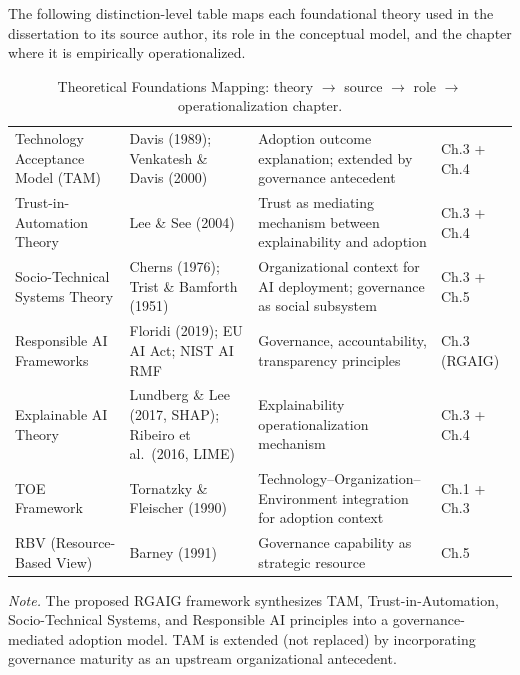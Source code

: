 \noindent The following distinction-level table maps each foundational theory used in the dissertation to its source author, its role in the conceptual model, and the chapter where it is empirically operationalized.

{\tablestripes\tablefontsize
{}
\begin{xltabular}{\textwidth}{@{} >{\raggedright\arraybackslash}p{3.0cm} >{\raggedright\arraybackslash}p{3.0cm} L >{\raggedright\arraybackslash}p{2.0cm} @{}}
\caption[Theoretical Foundations Mapping]{Theoretical Foundations Mapping: theory $\rightarrow$ source $\rightarrow$ role $\rightarrow$ operationalization chapter.}\label{tab:distinction_theory_mapping} \\
\toprule
{} &  &  &  \\
\midrule
\endfirsthead
\endhead
\bottomrule
\endlastfoot
Technology Acceptance Model (TAM) & Davis (1989); Venkatesh \& Davis (2000) & Adoption outcome explanation; extended by governance antecedent & Ch.3 + Ch.4 \\
\addlinespace
Trust-in-Automation Theory & Lee \& See (2004) & Trust as mediating mechanism between explainability and adoption & Ch.3 + Ch.4 \\
\addlinespace
Socio-Technical Systems Theory & Cherns (1976); Trist \& Bamforth (1951) & Organizational context for AI deployment; governance as social subsystem & Ch.3 + Ch.5 \\
\addlinespace
Responsible AI Frameworks & Floridi (2019); EU AI Act; NIST AI RMF & Governance, accountability, transparency principles & Ch.3 (RGAIG) \\
\addlinespace
Explainable AI Theory & Lundberg \& Lee (2017, SHAP); Ribeiro et al.\ (2016, LIME) & Explainability operationalization mechanism & Ch.3 + Ch.4 \\
\addlinespace
TOE Framework & Tornatzky \& Fleischer (1990) & Technology--Organization--Environment integration for adoption context & Ch.1 + Ch.3 \\
\addlinespace
RBV (Resource-Based View) & Barney (1991) & Governance capability as strategic resource & Ch.5 \\
\end{xltabular}}
\vspace{0.3em}\noindent\textit{Note.} The proposed RGAIG framework synthesizes TAM, Trust-in-Automation, Socio-Technical Systems, and Responsible AI principles into a governance-mediated adoption model. TAM is extended (not replaced) by incorporating governance maturity as an upstream organizational antecedent.


